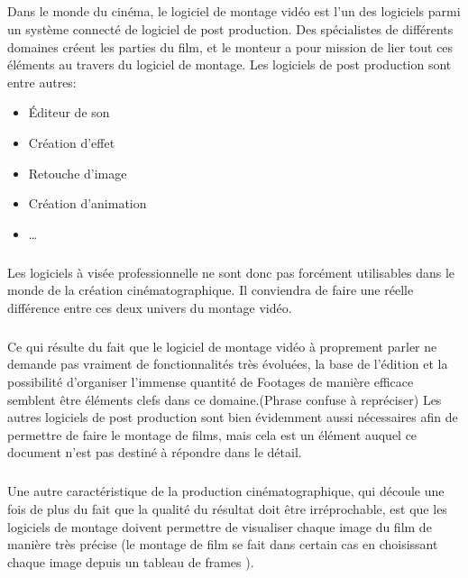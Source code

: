 \subparagraph{}

Dans le monde du cinéma, le logiciel de montage vidéo est l'un des logiciels
parmi un système connecté de logiciel de post production. Des spécialistes de
différents domaines créent les parties du film, et le monteur a pour mission
de lier tout ces éléments au travers du logiciel de montage. Les logiciels
de post production sont entre autres:

\begin{itemize} \setlength{\itemsep}{2mm}

  \item{Éditeur de son}

  \item{Création d'effet}

  \item{Retouche d'image}

  \item{Création d'animation}

  \item{\ldots}

\end{itemize}

\subparagraph{}

Les logiciels à visée professionnelle ne sont donc pas forcément utilisables dans
le monde de la création cinématographique. Il conviendra de faire une réelle
différence entre ces deux univers du montage vidéo.

\subparagraph{}

Ce qui résulte du fait que le logiciel de montage vidéo à proprement parler ne
demande pas vraiment de fonctionnalités très évoluées, la base de l'édition
et la possibilité d'organiser l'immense quantité de Footages de manière efficace
semblent être éléments clefs dans ce domaine.(Phrase confuse à repréciser) Les autres logiciels de
post production sont bien évidemment aussi nécessaires afin de permettre de faire
le montage de films, mais cela est un élément auquel ce document n'est pas destiné
à répondre dans le détail.

\subparagraph{}

Une autre caractéristique de la production cinématographique, qui découle une
fois de plus du fait que la qualité du résultat doit être irréprochable, est
que les logiciels de montage doivent permettre de visualiser chaque image du
film de manière très précise (le montage de film se fait dans certain cas en
choisissant chaque image depuis un tableau de frames ).


